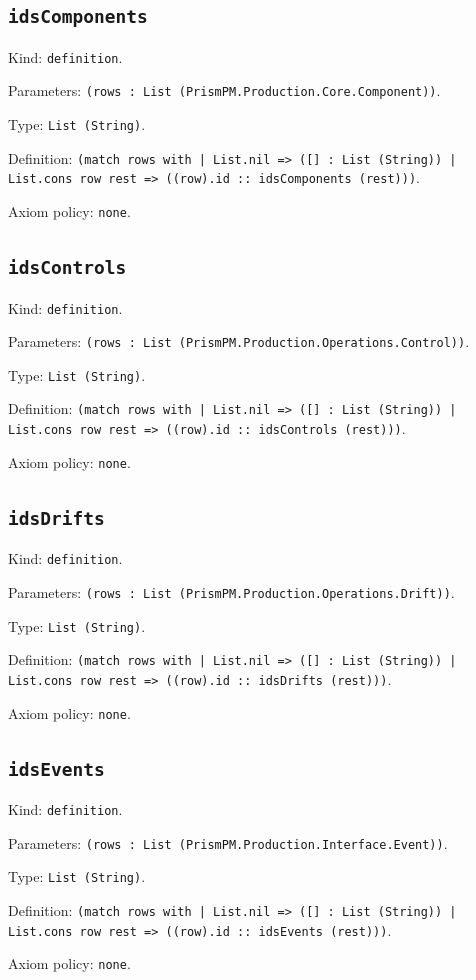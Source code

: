\documentclass[11pt]{article}
\begin{document}
\subsection*{\texttt{idsComponents}}
\noindent Kind: \texttt{definition}.\par
\noindent Parameters: \texttt{(rows : List (PrismPM.Production.Core.Component))}.\par
\noindent Type: \texttt{List (String)}.\par
\noindent Definition: \texttt{(match rows with | List.nil => ([] : List (String)) | List.cons row rest => ((row).id :: idsComponents (rest)))}.\par
\noindent Axiom policy: \texttt{none}.\par
\subsection*{\texttt{idsControls}}
\noindent Kind: \texttt{definition}.\par
\noindent Parameters: \texttt{(rows : List (PrismPM.Production.Operations.Control))}.\par
\noindent Type: \texttt{List (String)}.\par
\noindent Definition: \texttt{(match rows with | List.nil => ([] : List (String)) | List.cons row rest => ((row).id :: idsControls (rest)))}.\par
\noindent Axiom policy: \texttt{none}.\par
\subsection*{\texttt{idsDrifts}}
\noindent Kind: \texttt{definition}.\par
\noindent Parameters: \texttt{(rows : List (PrismPM.Production.Operations.Drift))}.\par
\noindent Type: \texttt{List (String)}.\par
\noindent Definition: \texttt{(match rows with | List.nil => ([] : List (String)) | List.cons row rest => ((row).id :: idsDrifts (rest)))}.\par
\noindent Axiom policy: \texttt{none}.\par
\subsection*{\texttt{idsEvents}}
\noindent Kind: \texttt{definition}.\par
\noindent Parameters: \texttt{(rows : List (PrismPM.Production.Interface.Event))}.\par
\noindent Type: \texttt{List (String)}.\par
\noindent Definition: \texttt{(match rows with | List.nil => ([] : List (String)) | List.cons row rest => ((row).id :: idsEvents (rest)))}.\par
\noindent Axiom policy: \texttt{none}.\par
\end{document}
